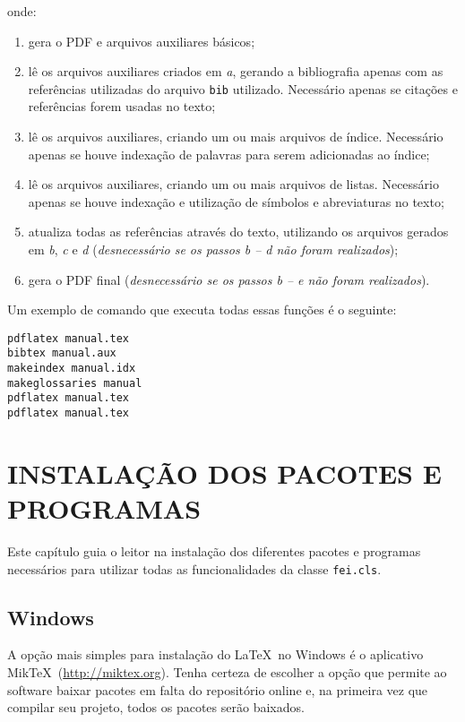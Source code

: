 \documentclass[xindy,rascunho]{fei}
\begin{document}
\begin{teorema}
	onde:
	
	\begin{enumerate}
	\item gera o PDF e arquivos auxiliares básicos;
	\item lê os arquivos auxiliares criados em \emph{a}, gerando a bibliografia apenas com as referências utilizadas do arquivo \texttt{bib} utilizado. Necessário apenas se citações e referências forem usadas no texto;
	\item lê os arquivos auxiliares, criando um ou mais arquivos de índice. Necessário apenas se houve indexação de palavras para serem adicionadas ao índice;
	\item lê os arquivos auxiliares, criando um ou mais arquivos de listas. Necessário apenas se houve indexação e utilização de símbolos e abreviaturas no texto;
	\item atualiza todas as referências através do texto, utilizando os arquivos gerados em \emph{b}, \emph{c} e \emph{d} (\emph{desnecessário se os passos b -- d não foram realizados});
	\item gera o PDF final (\emph{desnecessário se os passos b -- e não foram realizados}).
	\end{enumerate}
	
	Um exemplo de comando que executa todas essas funções é o seguinte:
	
	\begin{verbatim}
pdflatex manual.tex
bibtex manual.aux
makeindex manual.idx
makeglossaries manual
pdflatex manual.tex
pdflatex manual.tex
	\end{verbatim}
	
	\chapter{INSTALAÇÃO DOS PACOTES E PROGRAMAS}	\label{chap:instalacao}
	
	Este capítulo guia o leitor na instalação dos diferentes pacotes e programas necessários para utilizar todas as funcionalidades da classe \texttt{fei.cls}.
	
	\section{Windows}
	
	A opção mais simples para instalação do \LaTeX\ no Windows é o aplicativo Mik\TeX\ (\url{http://miktex.org}). Tenha certeza de escolher a opção que permite ao software baixar pacotes em falta do repositório online e, na primeira vez que compilar seu projeto, todos os pacotes serão baixados.
	

\end{teorema}
\end{document}
